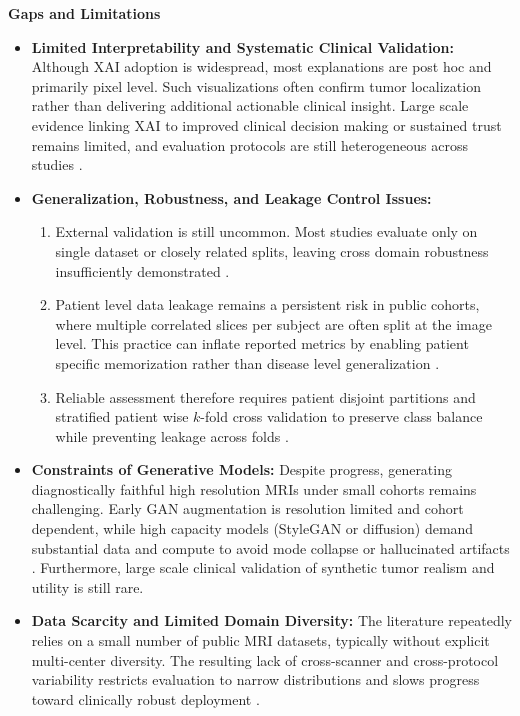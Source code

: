 \textbf{Gaps and Limitations}

\begin{itemize}
    \item \textbf{Limited Interpretability and Systematic Clinical Validation:} 
    Although XAI adoption is widespread, most explanations are post hoc and primarily pixel level. Such visualizations often confirm tumor localization rather than delivering additional actionable clinical insight. Large scale evidence linking XAI to improved clinical decision making or sustained trust remains limited, and evaluation protocols are still heterogeneous across studies \cite{gaur2022explanation,roy2024explainable,manz2025do}. 
        
    \item \textbf{Generalization, Robustness, and Leakage Control Issues:}
    \begin{enumerate}
        \item External validation is still uncommon. Most studies evaluate only on single dataset or closely related splits, leaving cross domain robustness insufficiently demonstrated \cite{Rehman2020,kumar2023braintumor}. 
        \item Patient level data leakage remains a persistent risk in public cohorts, where multiple correlated slices per subject are often split at the image level. This practice can inflate reported metrics by enabling patient specific memorization rather than disease level generalization \cite{Cheng2015,abiwinanda,deepak2019brain}. 
        \item Reliable assessment therefore requires patient disjoint partitions and stratified patient wise $k$-fold cross validation to preserve class balance while preventing leakage across folds \cite{5193232,Cheng2015}. 
    \end{enumerate}
    
    \item \textbf{Constraints of Generative Models:} 
    Despite progress, generating diagnostically faithful high resolution MRIs under small cohorts remains challenging. Early GAN augmentation is resolution limited and cohort dependent, while high capacity models (StyleGAN or diffusion) demand substantial data and compute to avoid mode collapse or hallucinated artifacts \cite{GHASSEMI2020101678,li2020tumorgan,Fetty2020,zuo2025multichannel}. Furthermore, large scale clinical validation of synthetic tumor realism and utility is still rare.
    
    \item \textbf{Data Scarcity and Limited Domain Diversity:} 
    The literature repeatedly relies on a small number of public MRI datasets, typically without explicit multi-center diversity. The resulting lack of cross-scanner and cross-protocol variability restricts evaluation to narrow distributions and slows progress toward clinically robust deployment \cite{Cheng2015,sajjad2019multigrade,Rehman2020}. 


\end{itemize}
